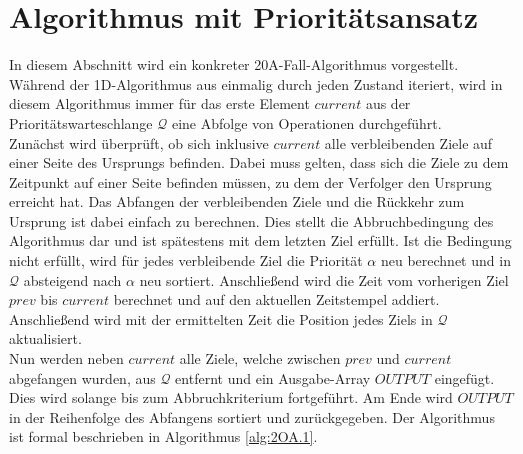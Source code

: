 \documentclass[german,version-2019-11]{uzl-thesis}
\begin{document}
\section{Algorithmus mit Prioritätsansatz}

In diesem Abschnitt wird ein konkreter 20A-Fall-Algorithmus vorgestellt. Während der 1D-Algorithmus aus \cite{helvig} einmalig durch jeden Zustand iteriert, wird in diesem Algorithmus immer für das erste Element $current$ aus der Prioritätswarteschlange $\mathcal{Q}$ eine Abfolge von Operationen durchgeführt. \\
Zunächst wird überprüft, ob sich inklusive $current$ alle verbleibenden Ziele auf einer Seite des Ursprungs befinden. Dabei muss gelten, dass sich die Ziele zu dem Zeitpunkt auf einer Seite befinden müssen, zu dem der Verfolger den Ursprung erreicht hat. Das Abfangen der verbleibenden Ziele und die Rückkehr zum Ursprung ist dabei einfach zu berechnen. Dies stellt die Abbruchbedingung des Algorithmus dar und ist spätestens mit dem letzten Ziel erfüllt. Ist die Bedingung nicht erfüllt, wird für jedes verbleibende Ziel die Priorität $\alpha$ neu berechnet und in $\mathcal{Q}$ absteigend nach $\alpha$ neu sortiert. 
Anschließend wird die Zeit vom vorherigen Ziel $prev$ bis $current$ berechnet und auf den aktuellen Zeitstempel addiert. Anschließend wird mit der ermittelten Zeit die Position jedes Ziels in $\mathcal{Q}$ aktualisiert.\\
Nun werden neben $current$ alle Ziele, welche zwischen $prev$ und $current$ abgefangen wurden, aus $\mathcal{Q}$ entfernt und ein Ausgabe-Array $OUTPUT$ eingefügt. Dies wird solange bis zum Abbruchkriterium fortgeführt. Am Ende wird $OUTPUT$ in der Reihenfolge des Abfangens sortiert und zurückgegeben. Der Algorithmus ist formal beschrieben in Algorithmus \ref{alg:2OA.1}.
\end{document}
